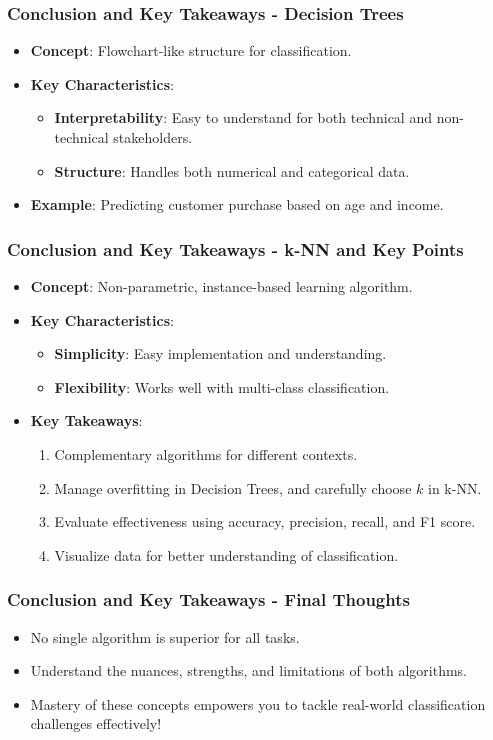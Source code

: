 \documentclass[aspectratio=169]{beamer}
\begin{document}
\begin{frame}[fragile]
    \frametitle{Conclusion and Key Takeaways - Decision Trees}
    \begin{itemize}
        \item \textbf{Concept}: Flowchart-like structure for classification.
        \item \textbf{Key Characteristics}:
        \begin{itemize}
            \item \textbf{Interpretability}: Easy to understand for both technical and non-technical stakeholders.
            \item \textbf{Structure}: Handles both numerical and categorical data.
        \end{itemize}
        \item \textbf{Example}: Predicting customer purchase based on age and income.
    \end{itemize}
\end{frame}

\begin{frame}[fragile]
    \frametitle{Conclusion and Key Takeaways - k-NN and Key Points}
    \begin{itemize}
        \item \textbf{Concept}: Non-parametric, instance-based learning algorithm.
        \item \textbf{Key Characteristics}:
        \begin{itemize}
            \item \textbf{Simplicity}: Easy implementation and understanding.
            \item \textbf{Flexibility}: Works well with multi-class classification.
        \end{itemize}
        \item \textbf{Key Takeaways}:
        \begin{enumerate}
            \item Complementary algorithms for different contexts.
            \item Manage overfitting in Decision Trees, and carefully choose $k$ in k-NN.
            \item Evaluate effectiveness using accuracy, precision, recall, and F1 score.
            \item Visualize data for better understanding of classification.
        \end{enumerate}
    \end{itemize}
\end{frame}

\begin{frame}[fragile]
    \frametitle{Conclusion and Key Takeaways - Final Thoughts}
    \begin{itemize}
        \item No single algorithm is superior for all tasks.
        \item Understand the nuances, strengths, and limitations of both algorithms.
        \item Mastery of these concepts empowers you to tackle real-world classification challenges effectively!
    \end{itemize}
\end{frame}
\end{document}
